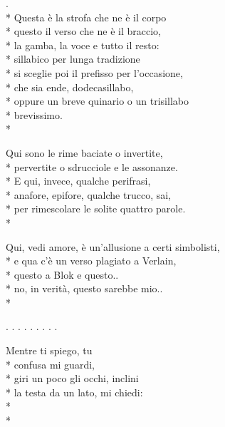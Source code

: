 \documentclass[12pt]{book}
\begin{document}
\begin{poem}{}{}

\settowidth{\versewidth}{non meno è ciò che meriti.}

\begin{altverse}
.\\*
Questa è la strofa che ne è il corpo \\*
questo il verso che ne è il braccio, \\*
la gamba, la voce e tutto il resto: \\*
sillabico per lunga tradizione \\*
si sceglie poi il prefisso per l'occasione, \\*
che sia ende, dodecasillabo, \\*
oppure un breve quinario o un trisillabo \\*
brevissimo. \\* 
\end{altverse}

\begin{altverse}
Qui sono le rime baciate o invertite, \\*
pervertite o sdrucciole e le assonanze. \\*
E qui, invece, qualche perifrasi, \\*
anafore, epifore, qualche trucco, sai, \\*
per rimescolare le solite quattro parole. \\*
\end{altverse}

\begin{altverse}
Qui, vedi amore, è un'allusione a certi simbolisti, \\*
e qua c'è un verso plagiato a Verlain, \\*
questo a Blok e questo.. \\*
no, in verità, questo sarebbe mio.. \\* 
\end{altverse}

. . . . . . . . .

\begin{altverse}
Mentre ti spiego, tu \\*
confusa mi guardi, \\*
giri un poco gli occhi, inclini \\*
la testa da un lato, mi chiedi: \\*
 \\*
\end{altverse}


\end{poem}
\end{document}
